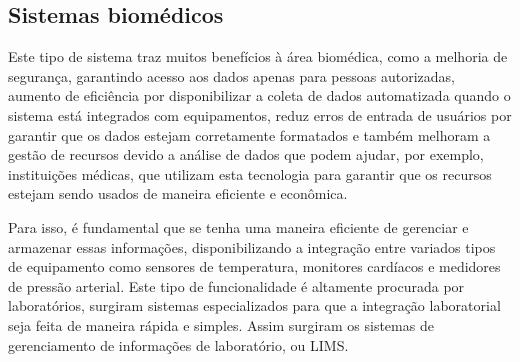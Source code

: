 \subsection{Sistemas biomédicos}

Este tipo de sistema traz muitos benefícios à área biomédica, como a melhoria de segurança, garantindo acesso aos dados apenas para pessoas autorizadas, aumento de eficiência por disponibilizar a coleta de dados automatizada quando o sistema está integrados com equipamentos, reduz erros de entrada de usuários por garantir que os dados estejam corretamente formatados e também melhoram a gestão de recursos devido a análise de dados que podem ajudar, por exemplo, instituições médicas, que utilizam esta tecnologia para garantir que os recursos estejam sendo usados de maneira eficiente e econômica.

Para isso, é fundamental que se tenha uma maneira eficiente de gerenciar e armazenar essas informações, disponibilizando a integração entre variados tipos de equipamento como sensores de temperatura, monitores cardíacos e medidores de pressão arterial. Este tipo de funcionalidade é altamente procurada por laboratórios, surgiram sistemas especializados para que a integração laboratorial seja feita de maneira rápida e simples. Assim surgiram os sistemas de gerenciamento de informações de laboratório, ou LIMS.






